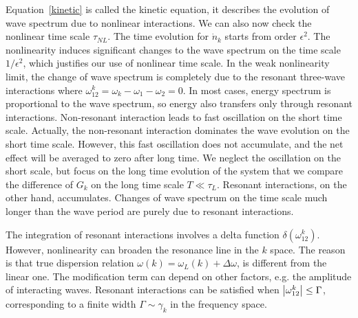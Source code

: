 Equation~\ref{kinetic} is called the kinetic equation, it describes the evolution of wave spectrum due to nonlinear interactions.
We can also now check the nonlinear time scale $\tau_{NL}$. 
The time evolution for $\dot{n}_k$ starts from order $\epsilon^2$. 
The nonlinearity induces significant changes to the wave spectrum on the time scale $1/\epsilon^2$, which justifies our use of nonlinear time scale.
In the weak nonlinearity limit, the change of wave spectrum is completely due to the resonant three-wave interactions where $\omega_{12}^k= \omega_k-\omega_1-\omega_2=0$. 
In most cases, energy spectrum is proportional to the wave spectrum, so energy also transfers only through resonant interactions.
Non-resonant interaction leads to fast oscillation on the short time scale. 
Actually, the non-resonant interaction dominates the wave evolution on the short time scale. 
However, this fast oscillation does not accumulate, and the net effect will be averaged to zero after long time. 
We neglect the oscillation on the short scale, but focus on the long time evolution of the system that we compare the difference of $G_k$ on the long time scale $T\ll\tau_L$.
Resonant interactions, on the other hand, accumulates. 
Changes of wave spectrum on the time scale much longer than the wave period are purely due to resonant interactions.

The integration of resonant interactions involves a delta function $\delta(\omega_{12}^k)$. However, nonlinearity can broaden the resonance line in the $k$ space. The reason is that true dispersion relation $\omega(k) = \omega_L(k) + \Delta \omega$, is different from the linear one. 
The modification term can depend on other factors, e.g. the amplitude of interacting waves. Resonant interactions can be satisfied when $\left|{ \omega_{12}^k}\right |\leq \Gamma$, corresponding to a finite width $\Gamma\sim \gamma_k$ in the frequency space.




